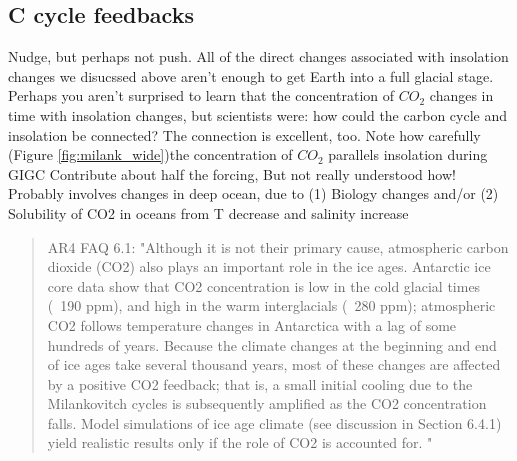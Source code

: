\subsection{C cycle feedbacks}
Nudge, but perhaps not push. All of the direct changes associated with insolation changes we disucssed above aren't enough to get Earth into a full glacial stage. Perhaps you aren't surprised to learn that the concentration of $CO_2$ changes in time with insolation changes, but scientists were: how could the carbon cycle and insolation be connected? The connection is excellent, too. Note how carefully (Figure \ref{fig:milank_wide})the concentration of $CO_2$ parallels insolation during GIGC   
Contribute about half the forcing, But not really understood how!
Probably involves changes in deep ocean, due to (1) Biology changes and/or
(2) Solubility of CO2 in oceans from T decrease and salinity increase 
\begin{quotation}
	AR4 FAQ 6.1: "Although it is not their primary cause, atmospheric carbon dioxide (CO2) also plays an important role in the ice ages. Antarctic ice core data show that CO2 concentration is low in the cold glacial times (~190 ppm), and high in the warm interglacials (~280 ppm); atmospheric CO2 follows temperature changes in Antarctica with a lag of some hundreds of years. Because the climate changes at the beginning and end of ice ages take several thousand years, most of these changes are affected by a positive CO2 feedback; that is, a small initial cooling due to the Milankovitch cycles is subsequently amplified as the CO2 concentration falls. Model simulations of ice age climate (see discussion in Section 6.4.1) yield realistic results only if the role of CO2 is accounted for. "
\end{quotation}
